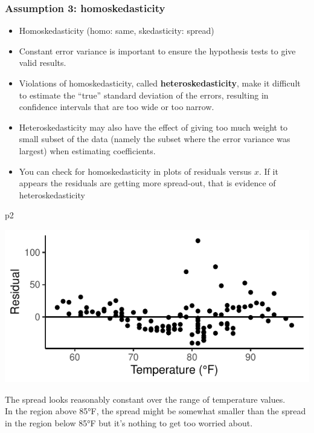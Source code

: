 \documentclass[a4paper]{article}
\begin{document}
\subsubsection{Assumption 3: homoskedasticity}
\begin{itemize}
	\item Homoskedasticity (homo: same, skedasticity: spread)
	\item Constant error variance is important to ensure the hypothesis tests to give valid results.
	\item Violations of homoskedasticity, called \textbf{heteroskedasticity}, make it difficult to estimate the ``true'' standard deviation of the errors, resulting in confidence intervals that are too wide or too narrow.
	\item Heteroskedasticity may also have the effect of giving too much weight to small subset of the data (namely the subset where the error variance was largest) when estimating coefficients.
	\item You can check for homoskedasticity in plots of residuals versus \( x \). If it appears the residuals are getting more spread-out, that is evidence of heteroskedasticity
\end{itemize}
\begin{Schunk}
\begin{Sinput}
p2
\end{Sinput}


{\centering \includegraphics[width=\maxwidth]{figure/listings-unnamed-chunk-351-1} 

}

\end{Schunk}
The spread looks reasonably constant over the range of temperature values.\\
In the region above 85°F, the spread might be somewhat smaller than the spread in the region below 85°F but it's nothing to get too worried about.
\end{document}
